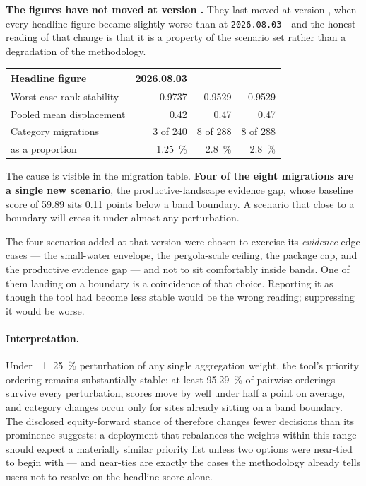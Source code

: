 \begin{keynote}
\noindent\textbf{The figures have not moved at version \methver{}.} They last
moved at version \prevver{}, when every headline figure became slightly worse
than at \texttt{2026.08.03}---and the honest reading of that change is that it
is a property of the scenario set rather than a degradation of the methodology.

\begin{center}\small
\begin{tabular}{@{}lrrr@{}}
\toprule
\textbf{Headline figure} & \textbf{2026.08.03} & \textbf{\prevver{}} &
\textbf{\methver{}} \\
\midrule
Worst-case rank stability      & 0.9737   & 0.9529 & 0.9529 \\
Pooled mean displacement       & 0.42     & 0.47   & 0.47 \\
Category migrations            & 3 of 240 & 8 of 288 & 8 of 288 \\
\quad as a proportion          & \SI{1.25}{\percent} & \SI{2.8}{\percent} &
\SI{2.8}{\percent} \\
\bottomrule
\end{tabular}
\end{center}

\noindent The cause is visible in the migration table. \textbf{Four of the
eight migrations are a single new scenario}, the productive-landscape evidence
gap, whose baseline score of \num{59.89} sits \num{0.11} points below a band
boundary. A scenario that close to a boundary will cross it under almost any
perturbation.

The four scenarios added at that version were chosen to exercise its
\emph{evidence} edge cases --- the small-water envelope, the pergola-scale
ceiling, the package cap, and the productive evidence gap --- and not to sit
comfortably inside bands. One of them landing on a boundary is a coincidence of that choice.
Reporting it as though the tool had become less stable would be the wrong
reading; suppressing it would be worse.
\end{keynote}

\paragraph{Interpretation.} Under \SI{\pm 25}{\percent} perturbation of any
single aggregation weight, the tool's priority ordering remains substantially
stable: at least \SI{95.29}{\percent} of pairwise orderings survive every
perturbation, scores move by well under half a point on average, and category
changes occur only for sites already sitting on a band boundary. The disclosed
equity-forward stance of  therefore changes fewer
decisions than its prominence suggests: a deployment that rebalances the
weights within this range should expect a materially similar priority list
unless two options were near-tied to begin with --- and near-ties are exactly
the cases the methodology already tells users not to resolve on the headline
score alone.

